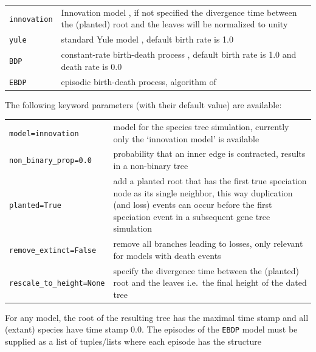 \documentclass[hidelinks,11pt]{article}
\newcommand{\sq}{\textquotesingle}
\begin{document}
\vspace{3mm}
{\small\centering
	\begin{longtable}{ p{3.5cm} p{10cm} }
		\texttt{\sq innovation\sq} & Innovation model \citet{keller-schmidt2012},
		if not specified the divergence time between the (planted) root and the
		leaves will be normalized to unity\\
		\texttt{\sq yule\sq}  & standard Yule model \citep{yule1924}, default birth
		rate is 1.0 \\
		\texttt{\sq BDP\sq} & constant-rate birth-death process \citep[see
		e.g.][]{kendall1948,hagen2018}, default birth rate is 1.0 and death rate is
		0.0 \\
		\texttt{\sq EBDP\sq} & episodic birth-death process, algorithm of
		\cite{stadler2011} \\
	\end{longtable}
}
\vspace{3mm}

\noindent
The following keyword parameters (with their default value) are available:

\vspace{3mm}
{\small\centering
\begin{longtable}{ p{3.5cm} p{10cm} }
	\texttt{model=\sq innovation\sq}  & model for the species tree simulation,
	currently only the `innovation model' is available\\
	\texttt{non\_binary\_prop=0.0} & probability that an inner edge is contracted,
	results in a non-binary tree\\
	\texttt{planted=True} & add a planted root that has the first true speciation node as its
	single neighbor, this way duplication (and loss) events can occur before the first speciation event in a subsequent gene tree simulation\\
	\texttt{remove\_extinct=\newline False} & remove all branches leading to losses, only relevant for models with death events\\
	\texttt{rescale\_to\_height=\newline None} & specify the divergence time between the (planted) root and the leaves i.e.\ the final height of the dated tree\\
\end{longtable}
}
\vspace{3mm}

For any model, the root of the resulting tree has the maximal time stamp and all (extant) species have time stamp 0.0.
The episodes of the \texttt{\sq EBDP\sq} model must be supplied as a list of
tuples/lists where each episode has the structure
\end{document}
